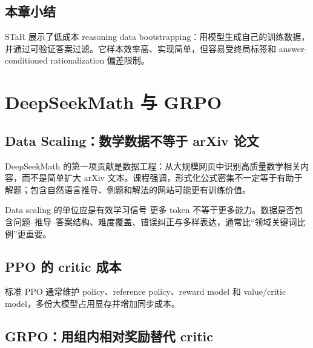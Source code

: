 \documentclass[a4paper]{article}
\begin{document}
\subsection{本章小结}

STaR 展示了低成本 reasoning data bootstrapping：用模型生成自己的训练数据，并通过可验证答案过滤。它样本效率高、实现简单，但容易受终局标签和 answer-conditioned rationalization 偏差限制。

\section{DeepSeekMath 与 GRPO}

\subsection{Data Scaling：数学数据不等于 arXiv 论文}

DeepSeekMath 的第一项贡献是数据工程：从大规模网页中识别高质量数学相关内容，而不是简单扩大 arXiv 文本。课程强调，形式化公式密集不一定等于有助于解题；包含自然语言推导、例题和解法的网站可能更有训练价值。




\begin{importantbox}{Data scaling 的单位应是有效学习信号}
更多 token 不等于更多能力。数据是否包含问题--推导--答案结构、难度覆盖、错误纠正与多样表达，通常比“领域关键词比例”更重要。
\end{importantbox}

\subsection{PPO 的 critic 成本}

标准 PPO 通常维护 policy、reference policy、reward model 和 value/critic model，多份大模型占用显存并增加同步成本。


\subsection{GRPO：用组内相对奖励替代 critic}
\end{document}
